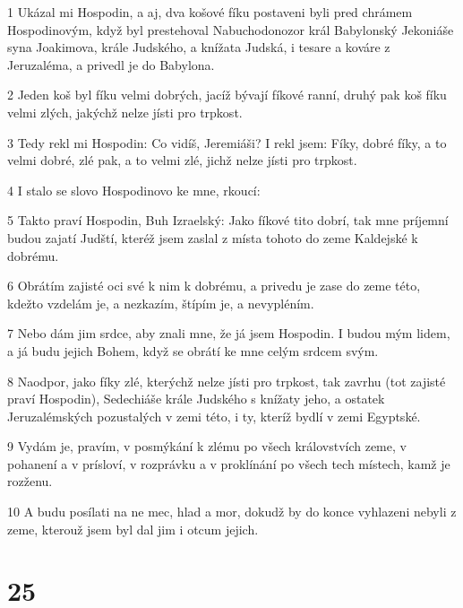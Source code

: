 \par 1 Ukázal mi Hospodin, a aj, dva košové fíku postaveni byli pred chrámem Hospodinovým, když byl prestehoval Nabuchodonozor král Babylonský Jekoniáše syna Joakimova, krále Judského, a knížata Judská, i tesare a kováre z Jeruzaléma, a privedl je do Babylona.
\par 2 Jeden koš byl fíku velmi dobrých, jacíž bývají fíkové ranní, druhý pak koš fíku velmi zlých, jakýchž nelze jísti pro trpkost.
\par 3 Tedy rekl mi Hospodin: Co vidíš, Jeremiáši? I rekl jsem: Fíky, dobré fíky, a to velmi dobré, zlé pak, a to velmi zlé, jichž nelze jísti pro trpkost.
\par 4 I stalo se slovo Hospodinovo ke mne, rkoucí:
\par 5 Takto praví Hospodin, Buh Izraelský: Jako fíkové tito dobrí, tak mne príjemní budou zajatí Judští, kteréž jsem zaslal z místa tohoto do zeme Kaldejské k dobrému.
\par 6 Obrátím zajisté oci své k nim k dobrému, a privedu je zase do zeme této, kdežto vzdelám je, a nezkazím, štípím je, a nevypléním.
\par 7 Nebo dám jim srdce, aby znali mne, že já jsem Hospodin. I budou mým lidem, a já budu jejich Bohem, když se obrátí ke mne celým srdcem svým.
\par 8 Naodpor, jako fíky zlé, kterýchž nelze jísti pro trpkost, tak zavrhu (tot zajisté praví Hospodin), Sedechiáše krále Judského s knížaty jeho, a ostatek Jeruzalémských pozustalých v zemi této, i ty, kteríž bydlí v zemi Egyptské.
\par 9 Vydám je, pravím, v posmýkání k zlému po všech královstvích zeme, v pohanení a v prísloví, v rozprávku a v proklínání po všech tech místech, kamž je rozženu.
\par 10 A budu posílati na ne mec, hlad a mor, dokudž by do konce vyhlazeni nebyli z zeme, kterouž jsem byl dal jim i otcum jejich.

\chapter{25}

